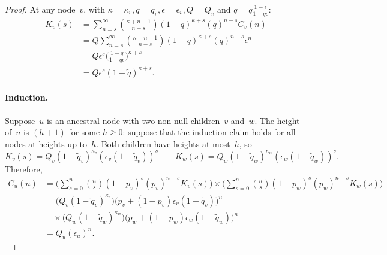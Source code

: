 \documentclass{elsarticle}
\newcommand{\nlik}{C}
\newcommand{\slik}{K}
\newcommand{\nx}{u}
\newcommand{\ny}{v}
\newcommand{\nz}{w}
\begin{document}
\begin{proof}
At any node~$\ny$, with $\kappa=\kappa_{\ny}, q=q_{\ny}, \epsilon=\epsilon_{\ny}, Q = Q_{\ny}$
and $\tilde{q} = q\frac{1-\epsilon}{1-q\epsilon}$: 
\begin{align*}
\slik_{\ny}(s) & = \sum_{n=s}^\infty \binom{\kappa+n-1}{n-s}(1-q)^{\kappa+s}(q)^{n-s}\nlik_{\ny}(n)
\\
		& = Q  \sum_{n=s}^\infty \binom{\kappa+n-1}{n-s}(1-q)^{\kappa+s}(q)^{n-s} \epsilon^n 
\\
		& = Q \epsilon^s \biggl(\frac{1-q}{1-q\epsilon}\biggr)^{\kappa+s}	
\\
		& = Q\epsilon^s (1-\tilde{q})^{\kappa+s}.		
\end{align*}

\paragraph{Induction.} Suppose~$\nx$ is an ancestral node 
with two non-null children~$\ny$ and~$\nz$. The height of~$\nx$ is 
$(h+1)$ for some $h\ge 0$:
suppose that the induction claim holds for all nodes at heights up to~$h$.  
Both children have heights at most~$h$, so 
\[
\slik_{\ny}(s) = Q_{\ny}(1-\tilde{q}_{\ny})^{\kappa_{\ny}} 
	(\epsilon_{\ny}(1-\tilde{q}_{\ny}))^{s}
\qquad
\slik_{\nz}(s) = Q_{\nz}(1-\tilde{q}_{\nz})^{\kappa_{\nz}} (\epsilon_{\nz}(1-\tilde{q}_{\nz}))^{s}.
\]
Therefore, 
\begin{align*}
\nlik_{\nx}(n) & = \biggl(\sum_{s=0}^n \binom{n}{s} (1-p_{\ny})^s (p_{\ny})^{n-s} \slik_{\ny}(s)\biggr)
	\times \biggl(\sum_{s=0}^n \binom{n}{s} (1-p_{\nz})^s (p_{\nz})^{n-s} \slik_{\nz}(s)\biggr)
\\
	& = \bigl(Q_{\ny} (1-\tilde{q}_{\ny})^{\kappa_{\ny}}\bigr)
	\bigl(p_{\ny}+(1-p_{\ny})\epsilon_{\ny}(1-\tilde{q}_{\ny})\bigr)^n 
	\\
	& \quad \times 
	\bigl(Q_{\nz} (1-\tilde{q}_{\nz})^{\kappa_{\nz}}\bigr)
	\bigl(p_{\nz}+(1-p_{\nz})\epsilon_{\nz}(1-\tilde{q}_{\nz})\bigr)^n
\\
	& = Q_{\nx} (\epsilon_{\nx})^n.
\end{align*}
\end{proof} 
\end{document}
